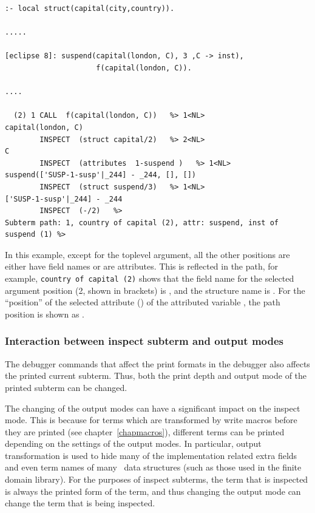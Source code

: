 \begin{descr}{1cm}
\begin{verbatim}
:- local struct(capital(city,country)).

.....

[eclipse 8]: suspend(capital(london, C), 3 ,C -> inst),
                     f(capital(london, C)).

....

  (2) 1 CALL  f(capital(london, C))   %> 1<NL>
capital(london, C)
        INSPECT  (struct capital/2)   %> 2<NL>
C
        INSPECT  (attributes  1-suspend )   %> 1<NL>
suspend(['SUSP-1-susp'|_244] - _244, [], [])
        INSPECT  (struct suspend/3)   %> 1<NL>
['SUSP-1-susp'|_244] - _244
        INSPECT  (-/2)   %>
Subterm path: 1, country of capital (2), attr: suspend, inst of
suspend (1) %>
\end{verbatim}


In this example, except for the toplevel argument, all the other positions are
either have field names or are attributes. This is reflected in the path,
for example, {\tt country of capital (2)} shows that the field name for
the selected argument position (2, shown in brackets) is ,
and the structure name is . For the ``position'' of the
selected attribute () of the attributed variable ,
the path position is shown as .


\subsubsection{Interaction between inspect subterm and output modes}

The debugger commands that affect the print formats in the debugger also
affects the printed current subterm. Thus, both the print depth and output
mode of the printed subterm can be changed.

The changing of the output modes can have a significant impact on the
inspect mode. This is because for  terms which are
transformed by write macros before they are printed (see
chapter~\ref{chapmacros}), different terms can be printed depending on the
settings of the output modes. In particular, output transformation is used
to hide many of the implementation related extra fields and even term names
of many \eclipse\ data structures (such as those used in the finite domain
library). For the purposes of inspect subterms, the term that is inspected
is always the printed form of the term, and thus changing the output mode
can change the term that is being inspected.


\end{descr}
